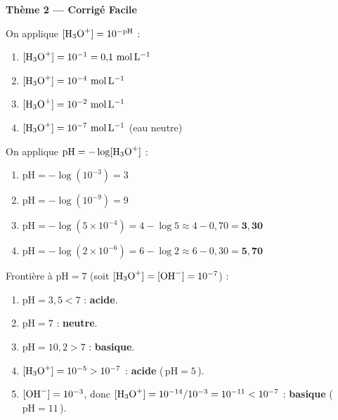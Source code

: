 \documentclass[11pt,a4paper]{article}
\begin{document}
\begin{center}
{\LARGE\bfseries\color{primarydark} Thème 2 --- Corrigé Facile}
\end{center}

\begin{corrbox}
On applique $[\ce{H3O+}] = 10^{-\mathrm{pH}}$ :
\begin{enumerate}[label=\alph*),leftmargin=1.6em,itemsep=1pt]
  \item $[\ce{H3O+}] = 10^{-1} = 0{,}1\ \si{mol.L^{-1}}$
  \item $[\ce{H3O+}] = 10^{-4}\ \si{mol.L^{-1}}$
  \item $[\ce{H3O+}] = 10^{-2}\ \si{mol.L^{-1}}$
  \item $[\ce{H3O+}] = 10^{-7}\ \si{mol.L^{-1}}$ (eau neutre)
\end{enumerate}
\end{corrbox}

\begin{corrbox}
On applique $\mathrm{pH} = -\log[\ce{H3O+}]$ :
\begin{enumerate}[label=\alph*),leftmargin=1.6em,itemsep=1pt]
  \item $\mathrm{pH} = -\log(10^{-3}) = 3$
  \item $\mathrm{pH} = -\log(10^{-9}) = 9$
  \item $\mathrm{pH} = -\log(5\times10^{-4}) = 4 - \log 5 \approx 4 - 0{,}70 = \mathbf{3{,}30}$
  \item $\mathrm{pH} = -\log(2\times10^{-6}) = 6 - \log 2 \approx 6 - 0{,}30 = \mathbf{5{,}70}$
\end{enumerate}
\end{corrbox}

\begin{corrbox}
Frontière à $\mathrm{pH}=7$ (soit $[\ce{H3O+}]=[\ce{OH-}]=10^{-7}$) :
\begin{enumerate}[label=\alph*),leftmargin=1.6em,itemsep=1pt]
  \item $\mathrm{pH}=3{,}5<7$ : \textcolor{acidecol}{\textbf{acide}}.
  \item $\mathrm{pH}=7$ : \textbf{neutre}.
  \item $\mathrm{pH}=10{,}2>7$ : \textcolor{basecol}{\textbf{basique}}.
  \item $[\ce{H3O+}]=10^{-5}>10^{-7}$ : \textcolor{acidecol}{\textbf{acide}} (\,$\mathrm{pH}=5$\,).
  \item $[\ce{OH-}]=10^{-3}$, donc $[\ce{H3O+}]=10^{-14}/10^{-3}=10^{-11}<10^{-7}$ :
        \textcolor{basecol}{\textbf{basique}} (\,$\mathrm{pH}=11$\,).
\end{enumerate}
\end{corrbox}
\end{document}
